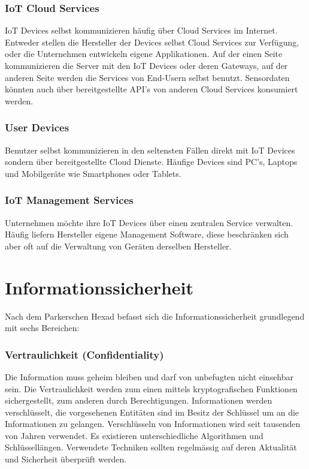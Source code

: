 \subsubsection{IoT Cloud Services}
IoT Devices selbst kommunizieren häufig über Cloud Services im Internet. Entweder stellen die Hersteller der Devices selbst Cloud Services zur Verfügung, oder die Unternehmen entwickeln eigene Applikationen. Auf der einen Seite kommunizieren die Server mit den IoT Devices oder deren Gateways, auf der anderen Seite werden die Services von End-Usern selbst benutzt. Sensordaten könnten auch über bereitgestellte API's von anderen Cloud Services konsumiert werden.

\subsubsection{User Devices}
Benutzer selbst kommunizieren in den seltensten Fällen direkt mit IoT Devices sondern über bereitgestellte Cloud Dienste. Häufige Devices sind PC's, Laptops und Mobilgeräte wie Smartphones oder Tablets.

\subsubsection{IoT Management Services}
Unternehmen möchte ihre IoT Devices über einen zentralen Service verwalten. Häufig liefern Hersteller eigene Management Software, diese beschränken sich aber oft auf die Verwaltung von Geräten derselben Hersteller.
\newpage
\section{Informationssicherheit}
Nach dem Parkerschen Hexad befasst sich die Informationssicherheit grundlegend mit sechs Bereichen: \cite{ParkerianHexad}
\subsubsection{Vertraulichkeit (Confidentiality)}
Die Information muss geheim bleiben und darf von unbefugten nicht einsehbar sein. Die Vertraulichkeit werden zum einen mittels kryptografischen Funktionen sichergestellt, zum anderen durch Berechtigungen. Informationen werden verschlüsselt, die vorgesehenen Entitäten sind im Besitz der Schlüssel um an die Informationen zu gelangen. Verschlüsseln von Informationen wird seit tausenden von Jahren verwendet. Es existieren unterschiedliche Algorithmen und Schlüssellängen. Verwendete Techniken sollten regelmässig auf deren Aktualität und Sicherheit überprüft werden.
